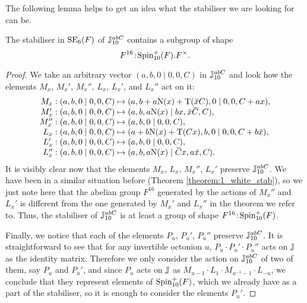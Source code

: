 The following lemma helps to get an idea what the stabiliser
we are looking for can be. 

\begin{lemma}
	\label{lemma:1_white_space_stab}
	The stabiliser in $\mathrm{SE}_6(F)$ of $\mathbb{J}_{10}^{abC}$ contains
	a subgroup of shape 
	\begin{equation}
		F^{16}\mathord{{\;\!{:}\;\!}}\mathrm{Spin}_{10}^+(F).F^{\times}.
	\end{equation}
\end{lemma}

\begin{proof}
	We take an arbitrary vector $(a,b,0 \mid 0,0,C)$ in 
	$\mathbb{J}_{10}^{abC}$ and look how the elements $M_x$, $M_x'$,
	$M_x''$, $L_x$, $L_x'$, and $L_x''$ act on it:
	\begin{equation*}
		\begin{array}{r@{\;}c@{\;}l}
			M_x: (a,b,0\mid 0,0,C) & \mapsto & 
				(a, b + a\NN(x) + \Tr(\ovx C), 0 \mid
					0,0, C + a x), \\
			
			M_x': (a,b,0\mid 0,0,C) & \mapsto & 
				(a, b, a \NN(x) \mid b x, \ovx \ovC, C), \\
				
			M_x'': (a,b,0 \mid 0,0,C) & \mapsto & 
				(a, b, 0 \mid 0, 0, C), \\
				
			L_x: (a,b,0 \mid 0,0,C) & \mapsto & 
				(a + b\NN(x) + \Tr(Cx), b, 0 \mid
					0, 0, C + b\ovx), \\
					
			L_x': (a,b,0 \mid 0,0,C) & \mapsto & 
				(a, b, 0 \mid 0,0,C), \\
				
			L_x'': (a,b,0 \mid 0,0,C) & \mapsto & 
				(a, b, a\NN(x) \mid
					\ovC x, a\ovx, C).
		\end{array}
	\end{equation*}
	It is visibly clear now that the elements $M_x$, $L_x$,
	$M_x''$, $L_x'$ preserve $\mathbb{J}_{10}^{abC}$. We have been in 
	a similar situation before 
	(Theorem \ref{theorem:1_white_stab}), so we just note here
	that the abelian group $F^{16}$ generated by the actions of
	$M_x''$ and $L_x'$ is different from the one generated by
	$M_x'$ and $L_x''$ in the theorem we refer to. Thus, 
	the stabiliser of $\mathbb{J}_{10}^{abC}$ is at least a group of
	shape $F^{16}\mathord{{\;\!{:}\;\!}}\mathrm{Spin}_{10}^+(F)$. 
	
	Finally, we notice that each of the elements $P_u$, $P_u'$,
	$P_u''$ preserve $\mathbb{J}_{10}^{abC}$. It is straightforward to see
	that for any invertible octonion $u$, $P_u \cdot P_u' \cdot
	P_u''$ acts on $\mathbb{J}$ as the identity matrix. Therefore we only
	consider the action on $\mathbb{J}_{10}^{abC}$ of two of them, say
	$P_u$ and $P_u'$, and since $P_u$ acts on $\mathbb{J}$ as
	$M_{u-1} \cdot L_1 \cdot M_{u^{-1}-1} \cdot L_{-u}$, 
	we conclude that they represent elements of 
	$\mathrm{Spin}_{10}^+(F)$, which we already have as a part of the 
	stabiliser, so it is enough to consider the elements $P_u'$.
	

\end{proof}
